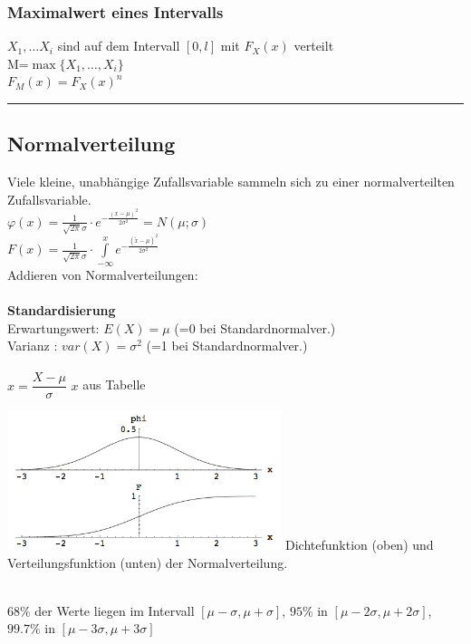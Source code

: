         \subsubsection{Maximalwert eines Intervalls }
		$X_1,\ldots X_i$ sind auf dem Intervall $[0,l]$ mit $F_X(x)$ verteilt\\
		M=$\max \{ X_1,\ldots,X_i\} $ \\
		$F_M(x)=F_X(x)^n$ \\

\hrule

	\subsection{Normalverteilung  }
		\begin{minipage}{10cm}
		Viele kleine, unabhängige Zufallsvariable sammeln sich zu einer
		normalverteilten Zufallsvariable.\\
		 $\varphi(x)=\frac{1}{\sqrt{2
		\pi}\sigma}\cdot e^{-\frac{(x-\mu)^2}{2\sigma^2}} = N(\mu ; \sigma) $\\ 
		$F(x)=\frac{1}{\sqrt{2
		\pi}\sigma}\cdot \int\limits^{x}_{-\infty}{e^{-\frac{(\tilde{x} -\mu)^2}{2\sigma^2}}} $ \\
		Addieren von Normalverteilungen: \\
		 \\
		\textbf{Standardisierung}\\ Erwartungswert: $E(X)=\mu$ \hspace{4mm}(=0 bei Standardnormalver.)\\ 
		Varianz \hspace{11.5mm}: $var(X)=\sigma^2$ (=1 bei Standardnormalver.)\\ \\
		$x=\dfrac{X-\mu}{\sigma}$ \hspace{5mm} $x$ aus Tabelle
		\end{minipage}
		\begin{minipage}{8cm}
		\includegraphics[width=8cm]{./bilder/normalverteilung.png}
		Dichtefunktion (oben) und Verteilungsfunktion (unten) der Normalverteilung. 
   		\end{minipage} \\ 
	$ 68\% $ der Werte liegen im Intervall $[ \mu - \sigma, \mu + \sigma]$, 
	$95\% $ in $[ \mu - 2\sigma, \mu + 2\sigma]$, 	
	$99.7\% $ in $[ \mu - 3\sigma, \mu + 3\sigma]$
		\vspace{5mm}
	


